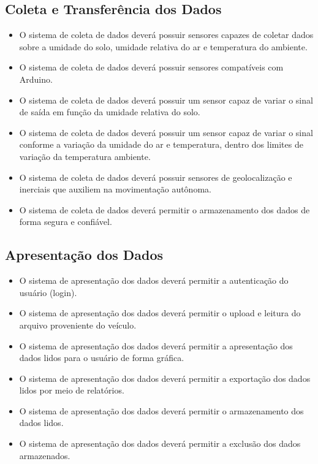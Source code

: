     \subsection{Coleta e Transferência dos Dados}

      \begin{itemize}
        \item O sistema de coleta de dados deverá possuir sensores capazes de coletar dados sobre a umidade do solo, umidade relativa do ar e temperatura do ambiente.
        \item O sistema de coleta de dados deverá possuir sensores compatíveis com Arduino.
        \item O sistema de coleta de dados deverá possuir um sensor capaz de variar o sinal de saída em função da umidade relativa do solo.
        \item O sistema de coleta de dados deverá possuir um sensor capaz de variar o sinal conforme a variação da umidade do ar e temperatura, dentro dos limites de variação da temperatura ambiente.
        \item O sistema de coleta de dados deverá possuir sensores de geolocalização e inerciais que auxiliem na movimentação autônoma.
        \item O sistema de coleta de dados deverá permitir o armazenamento dos dados de forma segura e confiável.
      \end{itemize}

    \subsection{Apresentação dos Dados}

      \begin{itemize}
        \item O sistema de apresentação dos dados deverá permitir a autenticação do usuário (login).
        \item O sistema de apresentação dos dados deverá permitir o upload e leitura do arquivo proveniente do veículo.
        \item O sistema de apresentação dos dados deverá permitir a apresentação dos dados lidos para o usuário de forma gráfica.
        \item O sistema de apresentação dos dados deverá permitir a exportação dos dados lidos por meio de relatórios.
        \item O sistema de apresentação dos dados deverá permitir o armazenamento dos dados lidos.
        \item O sistema de apresentação dos dados deverá permitir a exclusão dos dados armazenados.
      \end{itemize}
